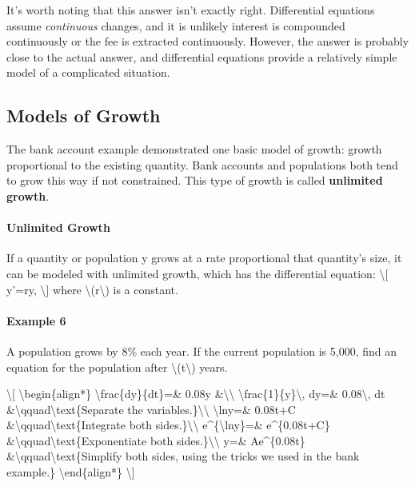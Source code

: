 It's worth noting that this answer isn't exactly right. Differential
equations assume \emph{continuous} changes, and it is unlikely interest
is compounded continuously or the fee is extracted continuously.
However, the answer is probably close to the actual answer, and
differential equations provide a relatively simple model of a
complicated situation.

\hypertarget{models-of-growth}{%
\subsection{Models of Growth}\label{models-of-growth}}

The bank account example demonstrated one basic model of growth: growth
proportional to the existing quantity. Bank accounts and populations
both tend to grow this way if not constrained. This type of growth is
called \textbf{unlimited growth}.

\hypertarget{unlimited-growth}{%
\paragraph{Unlimited Growth}\label{unlimited-growth}}

If a quantity or population y grows at a rate proportional that
quantity's size, it can be modeled with unlimited growth, which has the
differential equation: \textbackslash{}{[} y'=ry, \textbackslash{}{]}
where \textbackslash{}(r\textbackslash{}) is a constant.

\hypertarget{example-6}{%
\paragraph{Example 6}\label{example-6}}

A population grows by 8\% each year. If the current population is 5,000,
find an equation for the population after
\textbackslash{}(t\textbackslash{}) years.

\textbackslash{}{[} \textbackslash{}begin\{align*\}
\textbackslash{}frac\{dy\}\{dt\}=\& 0.08y
\&\textbackslash{}\textbackslash{}
\textbackslash{}frac\{1\}\{y\}\textbackslash{}, dy=\&
0.08\textbackslash{}, dt
\&\textbackslash{}qquad\textbackslash{}text\{Separate the
variables.\}\textbackslash{}\textbackslash{}
\textbackslash{}ln\textbar{}y\textbar{}=\& 0.08t+C
\&\textbackslash{}qquad\textbackslash{}text\{Integrate both
sides.\}\textbackslash{}\textbackslash{}
e\^{}\{\textbackslash{}ln\textbar{}y\textbar{}\}=\& e\^{}\{0.08t+C\}
\&\textbackslash{}qquad\textbackslash{}text\{Exponentiate both
sides.\}\textbackslash{}\textbackslash{} y=\& Ae\^{}\{0.08t\}
\&\textbackslash{}qquad\textbackslash{}text\{Simplify both sides, using
the tricks we used in the bank example.\} \textbackslash{}end\{align*\}
\textbackslash{}{]}

